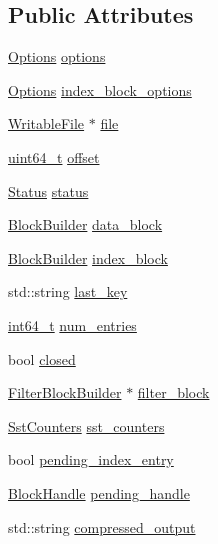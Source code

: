 \subsection*{Public Attributes}
\begin{DoxyCompactItemize}
\item 
\hyperlink{structleveldb_1_1_options}{Options} \hyperlink{structleveldb_1_1_table_builder_1_1_rep_a0ca1914136ea4c451b026b4f1913fe36}{options}
\item 
\hyperlink{structleveldb_1_1_options}{Options} \hyperlink{structleveldb_1_1_table_builder_1_1_rep_a3ae22fe880ca1b98c3a7e24c1ec72c98}{index\+\_\+block\+\_\+options}
\item 
\hyperlink{classleveldb_1_1_writable_file}{Writable\+File} $\ast$ \hyperlink{structleveldb_1_1_table_builder_1_1_rep_a3c33014db181b382785784cf0864f92b}{file}
\item 
\hyperlink{stdint_8h_aaa5d1cd013383c889537491c3cfd9aad}{uint64\+\_\+t} \hyperlink{structleveldb_1_1_table_builder_1_1_rep_a308abc45d45b23d05a0764f6fc501c40}{offset}
\item 
\hyperlink{classleveldb_1_1_status}{Status} \hyperlink{structleveldb_1_1_table_builder_1_1_rep_a8345f0a97587121457fb180a1fb081dd}{status}
\item 
\hyperlink{classleveldb_1_1_block_builder}{Block\+Builder} \hyperlink{structleveldb_1_1_table_builder_1_1_rep_a6bef8b1271d88ec2d38aa7a0f9ae8a24}{data\+\_\+block}
\item 
\hyperlink{classleveldb_1_1_block_builder}{Block\+Builder} \hyperlink{structleveldb_1_1_table_builder_1_1_rep_a7d5740122ca84239cb009d513cf14681}{index\+\_\+block}
\item 
std\+::string \hyperlink{structleveldb_1_1_table_builder_1_1_rep_a5a071831c7e42011a40b04cb60cdfa09}{last\+\_\+key}
\item 
\hyperlink{stdint_8h_adec1df1b8b51cb32b77e5b86fff46471}{int64\+\_\+t} \hyperlink{structleveldb_1_1_table_builder_1_1_rep_a89f93baffb3ca5c8239796dc1a57777a}{num\+\_\+entries}
\item 
bool \hyperlink{structleveldb_1_1_table_builder_1_1_rep_a5324550d58b999bcea173b1c21060138}{closed}
\item 
\hyperlink{classleveldb_1_1_filter_block_builder}{Filter\+Block\+Builder} $\ast$ \hyperlink{structleveldb_1_1_table_builder_1_1_rep_aad1620ca746b7287a819880be083ec6b}{filter\+\_\+block}
\item 
\hyperlink{classleveldb_1_1_sst_counters}{Sst\+Counters} \hyperlink{structleveldb_1_1_table_builder_1_1_rep_afe7e822e6356454a88e96e99273ae500}{sst\+\_\+counters}
\item 
bool \hyperlink{structleveldb_1_1_table_builder_1_1_rep_a56e14221a2e29941a37d208f99770c20}{pending\+\_\+index\+\_\+entry}
\item 
\hyperlink{classleveldb_1_1_block_handle}{Block\+Handle} \hyperlink{structleveldb_1_1_table_builder_1_1_rep_abf3b47f6f2b7407399c7134ac65f7225}{pending\+\_\+handle}
\item 
std\+::string \hyperlink{structleveldb_1_1_table_builder_1_1_rep_ae299e513afc71a8474c303b25aaadb08}{compressed\+\_\+output}
\end{DoxyCompactItemize}


